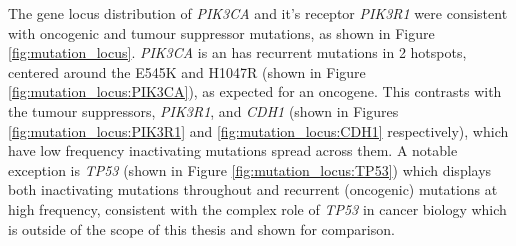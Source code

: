 The gene locus distribution of \textit{PIK3CA} and it's receptor \textit{PIK3R1} were consistent with oncogenic and tumour suppressor mutations, as shown in Figure \ref{fig:mutation_locus}. \textit{PIK3CA} is an has recurrent mutations in 2 hotspots, centered around the E545K and H1047R (shown in Figure \ref{fig:mutation_locus:PIK3CA}), as expected for an oncogene. This contrasts with the tumour suppressors, \textit{PIK3R1}, and \textit{CDH1} (shown in Figures \ref{fig:mutation_locus:PIK3R1} and \ref{fig:mutation_locus:CDH1} respectively), which have low frequency inactivating mutations spread across them. A notable exception is \textit{TP53} (shown in Figure \ref{fig:mutation_locus:TP53}) which displays both inactivating mutations throughout and recurrent (oncogenic) mutations at high frequency, consistent with the complex role of \textit{TP53} in cancer biology which is outside of the scope of this thesis and shown for comparison. 


